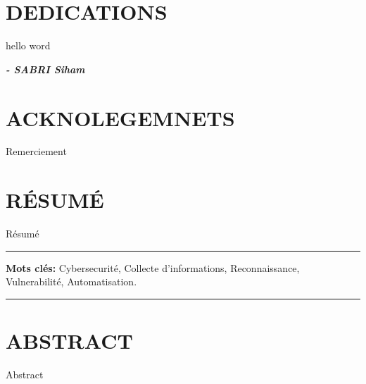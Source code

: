 \documentclass[english,a4paper,12pt,oneside,openany]{report}
\begin{document}
	



\chapter*{\centering \textcolor[rgb]{0,0,0.55}{DEDICATIONS}}


\begin{fquote}
	\begin{center}
		
		hello word 
		
	\end{center}	
\end{fquote}	




\hspace*{\fill} \textbf{\textit{\large{- SABRI Siham}}}


\chapter*{\centering \textcolor[rgb]{0,0,0.55}{ACKNOLEGEMNETS}}


Remerciement

\chapter*{\centering \textcolor[rgb]{0,0,0.55}{\MakeUppercase{Résumé}}}
Résumé

\vspace{6.5cm}



\noindent\rule[2pt]{\textwidth}{0.5pt}

{\textbf{Mots clés:}}
Cybersecurité, Collecte d'informations, Reconnaissance, Vulnerabilité, Automatisation.

\noindent\rule[2pt]{\textwidth}{0.5pt}

\chapter*{\centering \textcolor[rgb]{0,0,0.55}{{ABSTRACT}}}
Abstract
\end{document}
